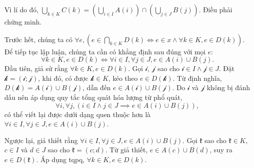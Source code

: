 Vì lí do đó, $\bigcup_{k \in K} C(k) = \left(\bigcup_{i \in I}A(i)\right) \cap \left(\bigcup_{j \in J}B(j)\right)$. Điều phải chứng minh.

\stepSubexercise Trước hết, chúng ta có $\forall e, \left(e \in \bigcap_{k \in K} D(k) \iff e \in x \land \forall k \in K, e \in D(k)\right)$. Để tiếp tục lập luận, chúng ta cần có khẳng định sau đúng với mọi $e$: \begin{equation*}
   \forall k \in K, e \in D(k) \iff \forall i \in I, \forall j \in J, e \in A(i) \cup B(j).
\end{equation*}
Đầu tiên, giả sử rằng $\forall k \in K, e \in D(k)$. Gọi $\mathcal{i}$, $\mathcal{j}$ sao cho $\mathcal{i} \in I \land \mathcal{j} \in J$. Đặt $\mathcal{k} = \left(\mathcal{i}; \mathcal{j}\right)$, khi đó, có được $\mathcal{k} \in K$, kéo theo $e \in D(\mathcal{k})$. Từ định nghĩa, $D(\mathcal{k}) = A(\mathcal{i}) \cup B(\mathcal{j})$, dẫn đến $e \in A(\mathcal{i}) \cup B(\mathcal{j})$. Do $\mathcal{i}$ và $\mathcal{j}$ không bị đánh dấu nên áp dụng quy tắc tổng quát hóa lượng từ phổ quát, \begin{equation*}
   \forall i, \forall j, \left(i \in I \land j \in J \implies e \in A(i) \cup B(j)\right),
\end{equation*}
có thể viết lại được dưới dạng quen thuộc hơn là $\forall i \in I, \forall j \in J, e \in A(i) \cup B(j)$.

Ngược lại, giả thiết rằng $\forall i \in I, \forall j \in J, e \in A(i) \cup B(j)$. Gọi $\mathfrak{k}$ sao cho $\mathfrak{k} \in K$, $c \in I$ và $d \in J$ sao cho $\mathfrak{k} = (c; d)$. Từ giả thiết, $e \in A(c) \cup B(d)$, suy ra $e \in D(\mathfrak{k})$. Áp dụng tqpq, $\forall k \in K, e \in D(k)$.

